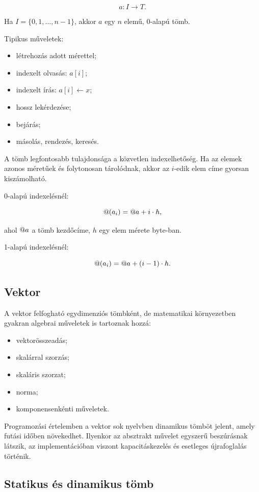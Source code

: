 \[
a:I\to T.
\]

Ha $I=\{0,1,\ldots,n-1\}$, akkor $a$ egy $n$ elemű, 0-alapú tömb.

Tipikus műveletek:

\begin{itemize}
  \item létrehozás adott mérettel;
  \item indexelt olvasás: $a[i]$;
  \item indexelt írás: $a[i]\leftarrow x$;
  \item hossz lekérdezése;
  \item bejárás;
  \item másolás, rendezés, keresés.
\end{itemize}

A tömb legfontosabb tulajdonsága a közvetlen indexelhetőség. Ha az elemek azonos méretűek és folytonosan tárolódnak, akkor az $i$-edik elem címe gyorsan kiszámolható.

0-alapú indexelésnél:

\[
@(a_i)=@ a+i\cdot h,
\]

ahol $@ a$ a tömb kezdőcíme, $h$ egy elem mérete byte-ban.

1-alapú indexelésnél:

\[
@(a_i)=@ a+(i-1)\cdot h.
\]

\subsection{Vektor}

A vektor felfogható egydimenziós tömbként, de matematikai környezetben gyakran algebrai műveletek is tartoznak hozzá:

\begin{itemize}
  \item vektorösszeadás;
  \item skalárral szorzás;
  \item skaláris szorzat;
  \item norma;
  \item komponensenkénti műveletek.
\end{itemize}

Programozási értelemben a vektor sok nyelvben dinamikus tömböt jelent, amely futási időben növekedhet. Ilyenkor az absztrakt művelet egyszerű beszúrásnak látszik, az implementációban viszont kapacitáskezelés és esetleges újrafoglalás történik.

\subsection{Statikus és dinamikus tömb}

